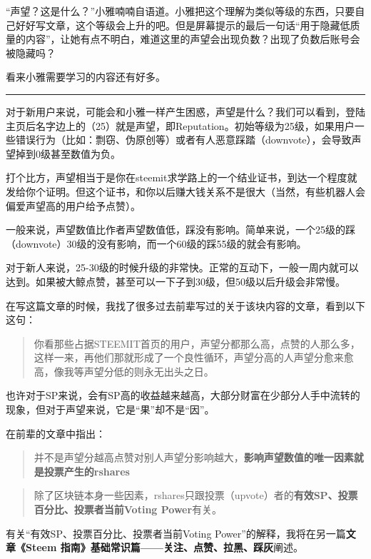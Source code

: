 \documentclass[]{ctexbook}
\begin{document}
``声望？这是什么？''小雅喃喃自语道。小雅把这个理解为类似等级的东西，只要自己好好写文章，这个等级会上升的吧。但是屏幕提示的最后一句话``用于隐藏低质量的内容''，让她有点不明白，难道这里的声望会出现负数？出现了负数后账号会被隐藏吗？

看来小雅需要学习的内容还有好多。

\begin{center}\rule{0.5\linewidth}{\linethickness}\end{center}

对于新用户来说，可能会和小雅一样产生困惑，声望是什么？我们可以看到，登陆主页后名字边上的（25）就是声望，即Reputation。初始等级为25级，如果用户一些错误行为（比如：剽窃、伪原创等）或者有人恶意踩踏（downvote），会导致声望掉到0级甚至数值为负。

打个比方，声望相当于是你在steemit求学路上的一个结业证书，到达一个程度就发给你个证明。但这个证书，和你以后赚大钱关系不是很大（当然，有些机器人会偏爱声望高的用户给予点赞）。

一般来说，声望数值比作者声望数值低，踩没有影响。简单来说，一个25级的踩（downvote）30级的没有影响，而一个60级的踩55级的就会有影响。

对于新人来说，25-30级的时候升级的非常快。正常的互动下，一般一周内就可以达到。如果被大鲸点赞，甚至可以一下子到30级，但50级以后升级会非常慢。

在写这篇文章的时候，我找了很多过去前辈写过的关于该块内容的文章，看到以下这句：

\begin{quote}
你看那些占据STEEMIT首页的用户，声望分都那么高，点赞的人那么多，这样一来，再他们那就形成了一个良性循环，声望分高的人声望分愈来愈高，像我等声望分低的则永无出头之日。
\end{quote}

也许对于SP来说，会有SP高的收益越来越高，大部分财富在少部分人手中流转的现象，但对于声望来说，它是``果''却不是``因''。

在前辈的文章中指出：

\begin{quote}
并不是声望分越高点赞对别人声望分影响越大，\textbf{影响声望数值的唯一因素就是投票产生的rshares}
\end{quote}

\begin{quote}
除了区块链本身一些因素，rshares只跟投票（upvote）者的\textbf{有效SP、投票百分比、投票者当前Voting Power}有关。
\end{quote}

有关``有效SP、投票百分比、投票者当前Voting Power''的解释，我将在另一篇\textbf{文章《Steem 指南》基础常识篇------关注、点赞、拉黑、踩灰}阐述。
\end{document}

